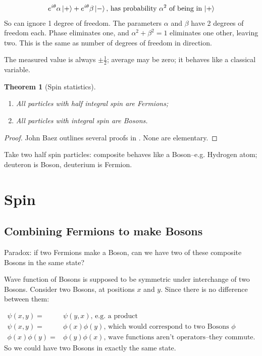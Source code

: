 \documentclass[]{article}
\newtheorem{thm}{Theorem}
\begin{document}
\begin{align*}
	e^{i\theta} \alpha \ket{+} + e^{i\theta}\beta \ket{-} \text{, has probability $\alpha^2$ of being in $\ket{+}$}
\end{align*}
So can ignore 1 degree of freedom. The parameters $\alpha$ and $\beta$ have 2 degrees of freedom each. Phase eliminates one, and $\alpha^2+\beta^2=1$ eliminates one other, leaving two. This is the same as number of degrees of freedom in direction.

The measured value is always $\pm \frac{1}{2}$; average may be zero; it behaves like a classical variable.

\begin{thm}[Spin statistics]
	\begin{enumerate}
		\item All particles with half integral spin are Fermions;
		\item All particles with  integral spin are Bosons.
	\end{enumerate}
\end{thm}

\begin{proof}
	John Baez outlines several proofs in \cite{baez2012spin}. None are elementary.
\end{proof}
Take two half spin particles: composite behaves like a Boson--e.g. Hydrogen atom; deuteron is Boson, deuterium is Fermion.


\section{Spin}

\subsection{Combining Fermions to make Bosons}

Paradox: if two Fermions make a Boson, can we have two of these composite Bosons in the same state?

Wave function of Bosons is supposed to be symmetric under interchange of two Bosons. Consider two Bosons, at positions $x$ and $y$. Since there is no difference between them:

\begin{align*}
	\psi(x,y) =&\psi(y,x) \text{, e.g. a product}\\
	\psi(x,y) =& \phi(x)\phi(y) \text{, which would correspond to two Bosons $\phi$}\\
	\phi(x)\phi(y) =& \phi(y)\phi(x) \text{, wave functions aren't operators--they commute.}
\end{align*}
So we could have two Bosons in exactly the same state.
\end{document}
